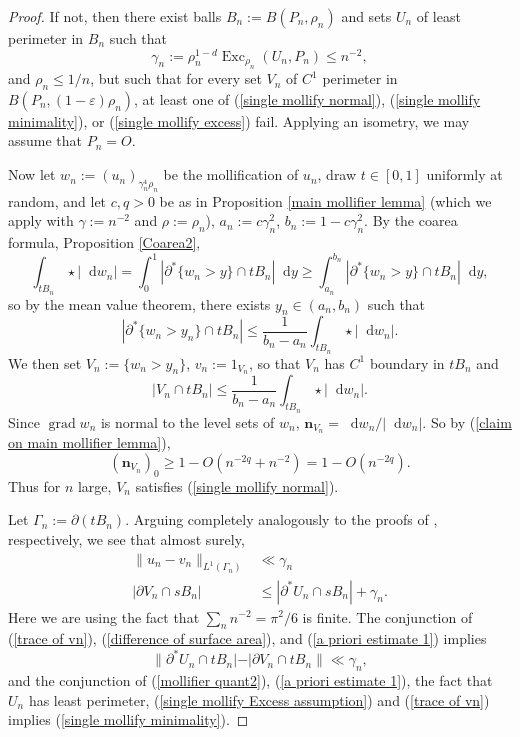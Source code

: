 \documentclass[reqno,11pt]{amsart}
\DeclareMathOperator{\Exc}{Exc}
\newcommand*\dif{\mathop{}\!\mathrm{d}}
\DeclareMathOperator{\grad}{grad}
\newcommand{\normal}{\mathbf n}
\theoremstyle{definition}
\numberwithin{equation}{section}
\begin{document}
\begin{proof}
If not, then there exist balls $B_n := B(P_n, \rho_n)$ and sets $U_n$ of least perimeter in $B_n$ such that
\begin{equation}\label{single mollify Excess assumption}
\gamma_n := \rho_n^{1 - d} \Exc_{\rho_n} (U_n, P_n) \leq n^{-2},
\end{equation}
and $\rho_n \leq 1/n$, but such that for every set $V_n$ of $C^1$ perimeter in $B(P_n, (1 - \varepsilon) \rho_n)$, at least one of (\ref{single mollify normal}), (\ref{single mollify minimality}), or (\ref{single mollify excess}) fail.
Applying an isometry, we may assume that $P_n = O$.

Now let $w_n := (u_n)_{\gamma_n^4 \rho_n}$ be the mollification of $u_n$, draw $t \in [0, 1]$ uniformly at random, and let $c, q > 0$ be as in Proposition \ref{main mollifier lemma} (which we apply with $\gamma := n^{-2}$ and $\rho := \rho_n$), $a_n := c\gamma_n^2$, $b_n := 1 - c\gamma_n^2$.
By the coarea formula, Proposition \ref{Coarea2},
$$\int_{tB_n} \star |\dif w_n| = \int_0^1 |\partial^* \{w_n > y\} \cap tB_n| \dif y \geq \int_{a_n}^{b_n} |\partial^* \{w_n > y\} \cap tB_n| \dif y,$$
so by the mean value theorem, there exists $y_n \in (a_n, b_n)$ such that
$$|\partial^* \{w_n > y_n\} \cap tB_n| \leq \frac{1}{b_n - a_n} \int_{tB_n} \star |\dif w_n|.$$
We then set $V_n := \{w_n > y_n\}$, $v_n := 1_{V_n}$, so that $V_n$ has $C^1$ boundary in $tB_n$ and
\begin{equation}\label{MVT mollifier}
|V_n \cap tB_n| \leq \frac{1}{b_n - a_n} \int_{tB_n} \star |\dif w_n|.
\end{equation}
Since $\grad w_n$ is normal to the level sets of $w_n$, $\normal_{V_n} = \dif w_n/|\dif w_n|$.
So by (\ref{claim on main mollifier lemma}),
$$(\normal_{V_n})_0 \geq 1 - O(n^{-2q} + n^{-2}) = 1 - O(n^{-2q}).$$
Thus for $n$ large, $V_n$ satisfies (\ref{single mollify normal}).

Let $\Gamma_n := \partial(tB_n)$.
Arguing completely analogously to the proofs of \cite[(7.23), (7.22)]{Giusti77}, respectively, we see that almost surely,
\begin{align}
\|u_n - v_n\|_{L^1(\Gamma_n)} &\ll \gamma_n \label{trace of vn} \\
|\partial V_n \cap sB_n| &\leq |\partial^* U_n \cap sB_n| + \gamma_n. \label{difference of surface area}
\end{align}
Here we are using the fact that $\sum_n n^{-2} = \pi^2/6$ is finite.
The conjunction of (\ref{trace of vn}), (\ref{difference of surface area}), and (\ref{a priori estimate 1}) implies
\begin{equation}
\|\partial^* U_n \cap tB_n| - |\partial V_n \cap tB_n\| \ll \gamma_n, \label{mollifier quant2}
\end{equation}
and the conjunction of (\ref{mollifier quant2}), (\ref{a priori estimate 1}), the fact that $U_n$ has least perimeter, (\ref{single mollify Excess assumption}) and (\ref{trace of vn}) implies (\ref{single mollify minimality}).


\end{proof}
\end{document}
